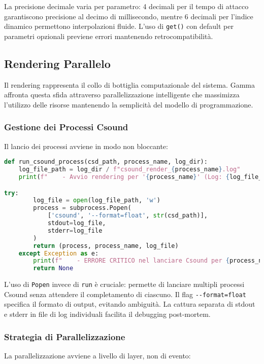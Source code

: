 La precisione decimale varia per parametro: 4 decimali per il tempo di attacco garantiscono precisione al decimo di millisecondo, mentre 6 decimali per l'indice dinamico permettono interpolazioni fluide. L'uso di \texttt{get()} con default per parametri opzionali previene errori mantenendo retrocompatibilità.
\subsection{Rendering Parallelo}
Il rendering rappresenta il collo di bottiglia computazionale del sistema. Gamma affronta questa sfida attraverso parallelizzazione intelligente che massimizza l'utilizzo delle risorse mantenendo la semplicità del modello di programmazione.
\subsubsection{Gestione dei Processi Csound}
Il lancio dei processi avviene in modo non bloccante:

\begin{lstlisting}[language=Python]
def run_csound_process(csd_path, process_name, log_dir):
    log_file_path = log_dir / f"csound_render_{process_name}.log"
    print(f"    - Avvio rendering per '{process_name}' (Log: {log_file_path.name})")

try:
        log_file = open(log_file_path, 'w')
        process = subprocess.Popen(
            ['csound', '--format=float', str(csd_path)], 
            stdout=log_file, 
            stderr=log_file
        )
        return (process, process_name, log_file)
    except Exception as e:
        print(f"    - ERRORE CRITICO nel lanciare Csound per {process_name}: {e}")
        return None
\end{lstlisting}

L'uso di \texttt{Popen} invece di \texttt{run} è cruciale: permette di lanciare multipli processi Csound senza attendere il completamento di ciascuno. Il flag \texttt{{-}{-}format=float} specifica il formato di output, evitando ambiguità. La cattura separata di stdout e stderr in file di log individuali facilita il debugging post-mortem.
\subsubsection{Strategia di Parallelizzazione}
La parallelizzazione avviene a livello di layer, non di evento:

